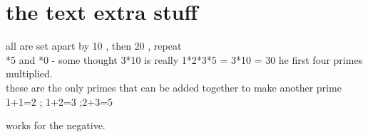 \documentclass[12pt,letterpaper,oneside,titlepage]{article}
\begin{document}
%
% 
 
 
 
 
 
 
 

\pagebreak 
\section{the text extra stuff}
\par 
all are set apart by 10 , then 20 , repeat
\\
*5 and *0  - some thought 3*10 is really 1*2*3*5 = 3*10 = 30 he first four primes multiplied. 
\\
these are the only primes that can be added together to make another prime 1+1=2 ; 1+2=3 ;2+3=5
\par 
works for the negative.
\end{document}
